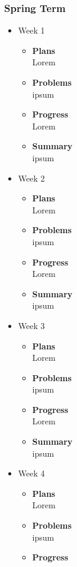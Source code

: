 	\subsubsection{Spring Term}
	\begin{itemize}
		\item{Week 1}
			\begin{itemize}
				\item \textbf{Plans} \\
				Lorem
				\item \textbf{Problems} \\
				ipsum
				\item \textbf{Progress} \\
				Lorem
				\item \textbf{Summary} \\
				ipsum
			\end{itemize}
		\item{Week 2}
			\begin{itemize}
				\item \textbf{Plans} \\
				Lorem
				\item \textbf{Problems} \\
				ipsum
				\item \textbf{Progress} \\
				Lorem
				\item \textbf{Summary} \\
				ipsum
			\end{itemize}
		\item{Week 3}
			\begin{itemize}
				\item \textbf{Plans} \\
				Lorem
				\item \textbf{Problems} \\
				ipsum
				\item \textbf{Progress} \\
				Lorem
				\item \textbf{Summary} \\
				ipsum
			\end{itemize}
		\item{Week 4}
			\begin{itemize}
				\item \textbf{Plans} \\
				Lorem
				\item \textbf{Problems} \\
				ipsum
				\item \textbf{Progress} \\

\end{itemize}
\end{itemize}
